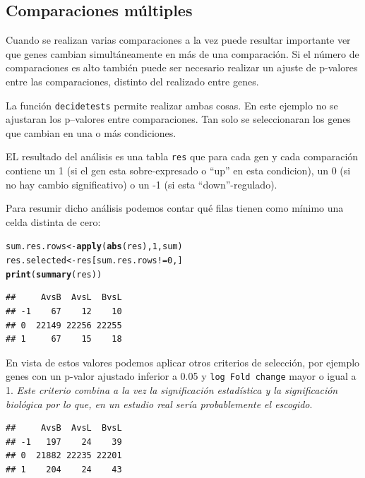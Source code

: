 \documentclass[a4paper]{article}\usepackage[]{graphicx}\usepackage[]{color}
\makeatletter
\newcommand{\hlnum}[1]{\textcolor[rgb]{0.686,0.059,0.569}{#1}}%
\newcommand{\hlopt}[1]{\textcolor[rgb]{0,0,0}{#1}}%
\newcommand{\hlstd}[1]{\textcolor[rgb]{0.345,0.345,0.345}{#1}}%
\newcommand{\hlkwb}[1]{\textcolor[rgb]{0.69,0.353,0.396}{#1}}%
\newcommand{\hlkwd}[1]{\textcolor[rgb]{0.737,0.353,0.396}{\textbf{#1}}}%
\newenvironment{kframe}{%
 \def\at@end@of@kframe{}%
 \ifinner\ifhmode%
  \def\at@end@of@kframe{\end{minipage}}%
  \begin{minipage}{\columnwidth}%
 \fi\fi%
 \def\FrameCommand##1{\hskip\@totalleftmargin \hskip-\fboxsep
 \colorbox{shadecolor}{##1}\hskip-\fboxsep
     \hskip-\linewidth \hskip-\@totalleftmargin \hskip\columnwidth}%
 \MakeFramed {\advance\hsize-\width
   \@totalleftmargin\z@ \linewidth\hsize
   \@setminipage}}%
 {\par\unskip\endMakeFramed%
 \at@end@of@kframe}
\newenvironment{knitrout}{}{} %
\makeatother
\begin{document}
\subsection{Comparaciones múltiples}

Cuando se realizan varias comparaciones a la vez puede resultar importante ver 
que genes cambian simultáneamente en más de una comparaci\'on.
Si el número de comparaciones es alto también puede ser necesario realizar un 
ajuste de p-valores entre las comparaciones, distinto del realizado entre genes.

La función \texttt{decidetests} permite realizar ambas cosas.
En este ejemplo no se ajustaran los p--valores entre comparaciones. Tan solo se seleccionaran los genes que cambian en una o más condiciones.

EL resultado del análisis es una tabla \texttt{res} que para cada gen y cada comparaci\'on 
contiene un 1 (si el gen esta sobre-expresado o ``up'' en esta condicion), 
un 0 (si no hay cambio significativo) o un -1 
(si esta ``down''-regulado).



Para resumir dicho análisis podemos contar qué filas tienen como mínimo una celda distinta de cero:

\begin{knitrout}
\color{fgcolor}\begin{kframe}
\begin{alltt}
\hlstd{sum.res.rows}\hlkwb{<-}\hlkwd{apply}\hlstd{(}\hlkwd{abs}\hlstd{(res),}\hlnum{1}\hlstd{,sum)}
\hlstd{res.selected}\hlkwb{<-}\hlstd{res[sum.res.rows}\hlopt{!=}\hlnum{0}\hlstd{,]}
\hlkwd{print}\hlstd{(}\hlkwd{summary}\hlstd{(res))}
\end{alltt}
\begin{verbatim}
##     AvsB  AvsL  BvsL
## -1    67    12    10
## 0  22149 22256 22255
## 1     67    15    18
\end{verbatim}
\end{kframe}
\end{knitrout}

En vista de estos valores podemos aplicar otros criterios de selección, por ejemplo genes con un p-valor ajustado inferior a 0.05 y \texttt{log Fold change} mayor o igual a 1.\emph{ Este criterio combina a la vez la significación estadística y la significación biológica por lo que, en un estudio real sería probablemente el escogido}.

\begin{knitrout}
\color{fgcolor}\begin{kframe}
\begin{verbatim}
##     AvsB  AvsL  BvsL
## -1   197    24    39
## 0  21882 22235 22201
## 1    204    24    43
\end{verbatim}
\end{kframe}
\end{knitrout}
\end{document}
